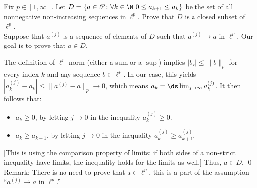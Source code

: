 \begin{hwsol}
Fix $p \in [1,\infty]$. Let $D= \{ a\in \ell^p \colon \forall k\in \N \ 0 \leq a_{k+1} \leq a_ k\}$ be the set of all nonnegative non-increasing sequences in $\ell^p$. Prove that $D$ is a closed subset of $\ell^p$. \\

\pf Suppose that $a^{(j)}$ is a sequence of elements of $D$ such that $a^{(j)} \to a$ in $\ell^p$. Our goal is to prove that $a \in D$. 

The definition of $\ell^p$ norm (either a sum or a $\sup$) implies $|b_k| \leq \|b\|_p$ for every index $k$ and any sequence $b \in \ell^p$. In our case, this yields  $|a_k^{(j)} - a_k|\leq \|a^{(j)} - a\|_p \to 0$, which means $a_k= \ds\lim_{j\to\infty} a_k^{(j)}$. It then follows that:
        \begin{itemize}
        \item $a_k \geq 0$, by letting $j \to 0$ in the inequality  $a_k^{(j)} \geq 0$. 
        \item $a_k \geq a_{k+1}$, by letting $j\to 0$ in the inequality  $a_k^{(j)} \geq a_{k+1}^{(j)}$. 
        \end{itemize}
[This is using the comparison property of limits: if both sides of a non-strict inequality have limits, the inequality holds for the limits as well.]  Thus, $a \in D$. \qed \\

\noindent Remark: There is no need to prove that $a\in \ell^p$, this is a part of the assumption ``$a^{(j)} \to a$ in $\ell^p$.'' \\
\end{hwsol}


